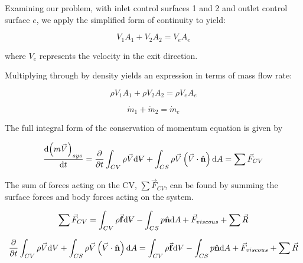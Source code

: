 \documentclass[../main.tex]{subfiles}
\begin{document}
Examining our problem, with inlet control surfaces 1 and 2 and outlet control surface $e$, we apply the simplified form of continuity to yield:

\[
    V_1 A_1 + V_2 A_2 = V_e A_e  
\]

where $V_e$ represents the velocity in the exit direction.

Multiplying through by density yields an expression in terms of mass flow rate:

\[
    \rho V_1 A_1 + \rho V_2 A_2 = \rho V_e A_e
\]

\[
    \dot{m}_1 + \dot{m}_2 = \dot{m}_e
\]

The full integral form of the conservation of momentum equation is given by

\begin{equation*}
    \frac{\dd (m\vec{V})_{sys}}{\dd t} = %
    \pdv{t} \int_{CV} \rho \vec{V} \dd \volume +%
    \int_{CS} \rho \vec{V} \left({\vec{V} \cdot \hat{\mathbf{n}}}\right) \dd A =%
    \sum{\vec{F}_{CV}}
\end{equation*}

The sum of forces acting on the CV, \(\sum{\vec{F}_{CV}}\), can be found by summing the surface forces and body forces acting on the system. 

\begin{equation*}
    \sum{\vec{F}_{CV}} =%
    \int_{CV} \rho \vec{\mathbf{f}} \dd \volume -
    \int_{CS} p \hat{\mathbf{n}} \dd A +
    \vec{F}_{viscous} +
    \sum \vec{R} 
\end{equation*}

\[
    \pdv{t} \int_{CV} \rho \vec{V} \dd \volume +%
    \int_{CS} \rho \vec{V} \left({\vec{V} \cdot \hat{\mathbf{n}}}\right) \dd A =%
    \int_{CV} \rho \vec{\mathbf{f}} \dd \volume -
    \int_{CS} p \hat{\mathbf{n}} \dd A +
    \vec{F}_{viscous} +
    \sum \vec{R} 
\]
\end{document}
